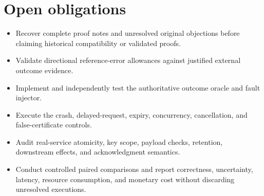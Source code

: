 \documentclass[11pt]{article}
\begin{document}
\section{Open obligations}
\begin{itemize}
\item Recover complete proof notes and unresolved original objections before claiming historical compatibility or validated proofs.
\item Validate directional reference-error allowances against justified external outcome evidence.
\item Implement and independently test the authoritative outcome oracle and fault injector.
\item Execute the crash, delayed-request, expiry, concurrency, cancellation, and false-certificate controls.
\item Audit real-service atomicity, key scope, payload checks, retention, downstream effects, and acknowledgment semantics.
\item Conduct controlled paired comparisons and report correctness, uncertainty, latency, resource consumption, and monetary cost without discarding unresolved executions.
\end{itemize}
\end{document}
